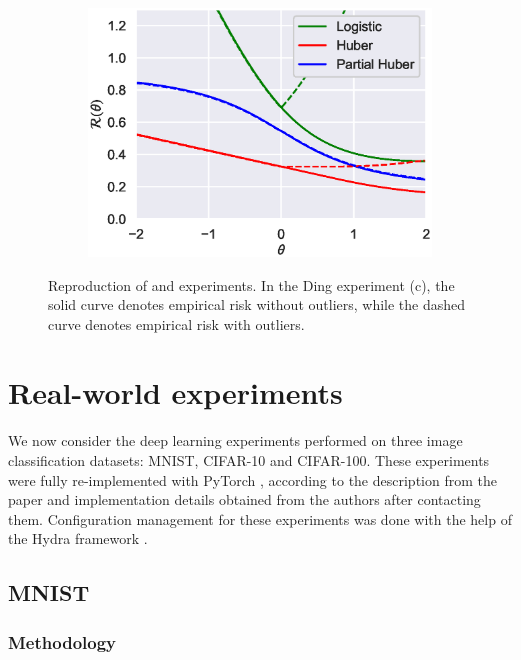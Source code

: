\begin{figure}[htp]
\begin{subfigure}{0.31\linewidth}
        \includegraphics[width=\columnwidth]{figs/ding_outlier.eps}
    \label{fig:ding-outlier}
  \end{subfigure}
  \caption{Reproduction of \textcite{long_random_2010} and \textcite{ding_statistical_2013} experiments. 
  In the Ding experiment (c), the solid curve denotes empirical risk without outliers, while the dashed curve denotes empirical risk with outliers.
  }
  \label{fig:synthetic}
\end{figure}

\section{Real-world experiments}
\label{sec:realworld}

We now consider the deep learning experiments performed on three image classification datasets: MNIST, CIFAR-10 and CIFAR-100. These experiments were fully re-implemented with PyTorch \parencite{paszke_pytorch_2019}, according to the description from the paper and implementation details obtained from the authors after contacting them. Configuration management for these experiments was done with the help of the Hydra framework \parencite{yadan_hydra_2019}.

        
\subsection{MNIST}

\subsubsection{Methodology}

